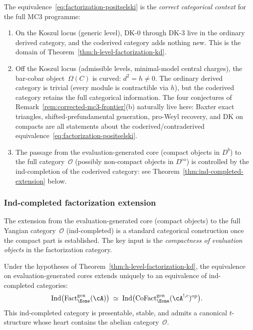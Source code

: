 \begin{remark}
\label{rem:coderived-natural-ambient}
The equivalence~\eqref{eq:factorization-positselski} is the
\emph{correct categorical context} for the full MC3 programme:
\begin{enumerate}[label=\textup{(\alph*)}]
\item On the Koszul locus (generic level), DK-0 through DK-3
  live in the ordinary derived category, and the coderived
  category adds nothing new.  This is the domain of
  Theorem~\ref{thm:h-level-factorization-kd}.
\item Off the Koszul locus (admissible levels, minimal-model central
  charges), the bar-cobar object~$\Omega(C)$ is curved:
  $d^2 = h \neq 0$.  The ordinary derived category is trivial
  (every module is contractible via $h$), but the coderived
  category retains the full categorical information.
  The four conjectures of
  Remark~\ref{rem:corrected-mc3-frontier}(b)
  naturally live here: Baxter exact triangles, shifted-prefundamental
  generation, pro-Weyl recovery, and DK on compacts are all
  statements about the coderived/contraderived
  equivalence~\eqref{eq:factorization-positselski}.
\item The passage from the evaluation-generated core (compact objects
  in $D^b$) to the full category~$\mathcal{O}$ (possibly
  non-compact objects in $D^{\mathrm{co}}$) is controlled by the
  ind-completion of the coderived category: see
  Theorem~\ref{thm:ind-completed-extension} below.
\end{enumerate}
\end{remark}

\subsubsection*{Ind-completed factorization extension}

The extension from the evaluation-generated core (compact objects)
to the full Yangian category~$\mathcal{O}$ (ind-completed)
is a standard categorical construction once the compact part is
established.  The key input is the
\emph{compactness of evaluation objects} in the factorization
category.

\begin{theorem}
\label{thm:ind-completed-extension}
Under the hypotheses of
Theorem~\textup{\ref{thm:h-level-factorization-kd}},
the equivalence on evaluation-generated cores extends uniquely
to an equivalence of ind-completed categories:
\begin{equation}\label{eq:ind-completed-dk}
\operatorname{Ind}\bigl(
  \operatorname{Fact}_{\Eone}^{\mathrm{gen}}(\cA)
\bigr)
\;\simeq\;
\operatorname{Ind}\bigl(
  \operatorname{CoFact}_{\Eone}^{\mathrm{gen}}(\cA^{!,c})
  ^{\mathrm{op}}
\bigr).
\end{equation}
This ind-completed category is presentable, stable, and admits
a canonical $t$-structure whose heart contains the abelian
category~$\mathcal{O}$.
\end{theorem}

